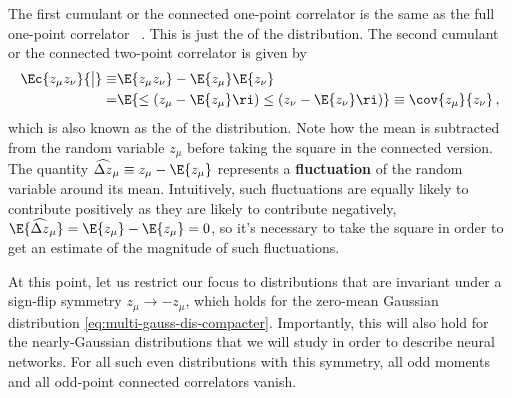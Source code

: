 The first cumulant or the connected one-point correlator is the same as the full one-point correlator
\be\label{eq:C1}
 \equiv  {}\, .
\ee
This is just the  of the distribution. The second cumulant or the connected two-point correlator is given by
\begin{align}\label{eq:C2}
\Ec{z_\mu z_\nu}{\big|} \equiv&  \E{z_\mu z_\nu} - \E{z_\mu}\E{z_\nu}\, \\
=&\E{\le(z_{\mu}-\E{z_{\mu}}\ri)\le(z_{\nu}-\E{z_{\nu}}\ri)}\equiv \cov{z_\mu}{z_\nu} \, ,\nonumber
\end{align}
which is also known as the  of the distribution. Note how the mean is subtracted from the random variable $z_\mu$ before taking the square in the connected version. The quantity $\widehat{\Delta z}_\mu \equiv z_{\mu}-\E{z_{\mu}}$ represents a \textbf{fluctuation} of the random variable around its mean. Intuitively, such fluctuations are equally likely to contribute positively as they are likely to contribute negatively, $\E{\widehat{\Delta z}_\mu} = \E{z_{\mu}}-\E{z_{\mu}}=0$, so it's necessary to take the square in order to get an estimate of the magnitude of such fluctuations.


At this point, let us restrict our focus to distributions that are invariant under a sign-flip symmetry $z_\mu \to - z_\mu$, which holds for the zero-mean Gaussian distribution \eqref{eq:multi-gauss-dis-compacter}.
Importantly, this  will also hold for the nearly-Gaussian distributions that we will study in order to describe neural networks. For all such even distributions with this symmetry, all odd moments and all odd-point connected correlators vanish.


